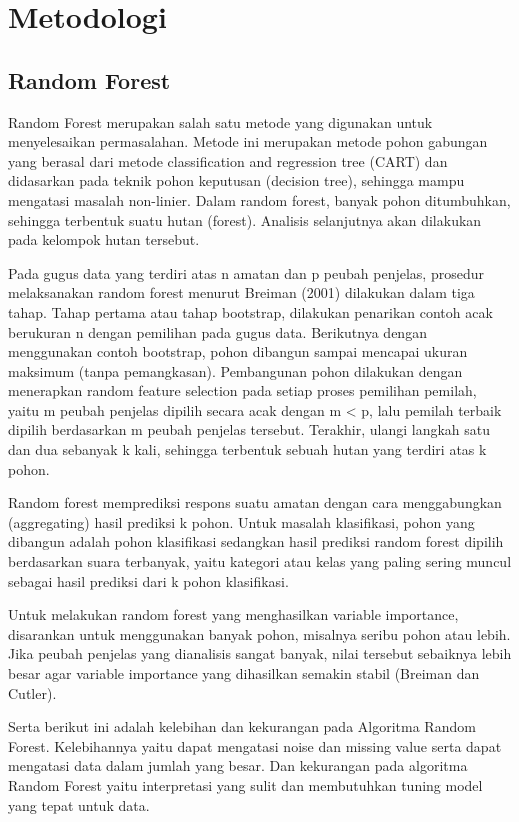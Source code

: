 \documentclass[conference]{IEEEtran}
\begin{document}
\section{Metodologi}
\subsection{Random Forest}
Random Forest merupakan salah satu metode yang digunakan untuk menyelesaikan permasalahan. Metode ini merupakan metode pohon gabungan yang berasal dari metode classification and regression tree (CART) dan didasarkan pada teknik pohon keputusan (decision tree), sehingga mampu mengatasi masalah non-linier. Dalam random forest, banyak pohon ditumbuhkan, sehingga terbentuk suatu hutan (forest). Analisis selanjutnya akan dilakukan pada kelompok hutan tersebut.

Pada gugus data yang terdiri atas n amatan dan p peubah penjelas, prosedur melaksanakan random forest menurut Breiman (2001) dilakukan dalam tiga tahap. Tahap pertama atau tahap bootstrap, dilakukan penarikan contoh acak berukuran n dengan pemilihan pada gugus data. Berikutnya dengan menggunakan contoh bootstrap, pohon dibangun sampai mencapai ukuran maksimum (tanpa pemangkasan). Pembangunan pohon dilakukan dengan menerapkan random feature selection pada setiap proses pemilihan pemilah, yaitu m peubah penjelas dipilih secara acak dengan m < p, lalu pemilah terbaik dipilih berdasarkan m peubah penjelas tersebut. Terakhir, ulangi langkah satu dan dua sebanyak k kali, sehingga terbentuk sebuah hutan yang terdiri atas k pohon.

Random forest memprediksi respons suatu amatan dengan cara menggabungkan (aggregating) hasil prediksi k pohon. Untuk masalah klasifikasi, pohon yang dibangun adalah pohon klasifikasi sedangkan hasil prediksi random forest dipilih berdasarkan suara terbanyak, yaitu kategori atau kelas yang paling sering muncul sebagai hasil prediksi dari k pohon klasifikasi.

Untuk melakukan random forest yang menghasilkan variable importance, disarankan untuk menggunakan banyak pohon, misalnya seribu pohon atau lebih. Jika peubah penjelas yang dianalisis sangat banyak, nilai tersebut sebaiknya lebih besar agar variable importance yang dihasilkan semakin stabil (Breiman dan Cutler).

Serta berikut ini adalah kelebihan dan kekurangan pada Algoritma Random Forest. Kelebihannya yaitu dapat mengatasi noise dan missing value serta dapat mengatasi data dalam jumlah yang besar. Dan kekurangan pada algoritma Random Forest yaitu interpretasi yang sulit dan membutuhkan tuning model yang tepat untuk data.
\end{document}
